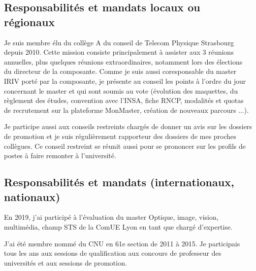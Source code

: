 \documentclass[a4paper,12pt]{article}
\begin{document}
\subsection{Responsabilités et mandats locaux ou régionaux}

Je suis membre élu du collège A du conseil de Telecom Physique Strasbourg depuis 2010. Cette mission consiste principalement à assister aux 3 réunions annuelles, plus quelques réunions extraordinaires, notamment lors des élections du directeur de la composante. Comme je suis aussi coresponsable du master IRIV porté par la composante, je présente au conseil les points à l'ordre du jour concernant le master et qui sont soumis au vote (évolution des maquettes, du règlement des études, convention avec l'INSA, fiche RNCP, modalités et quotas de recrutement sur la plateforme MonMaster, création de nouveaux parcours ...).

Je participe aussi aux conseils restreints chargés de donner un avis sur les dossiers de promotion et je suis régulièrement rapporteur des dossiers de mes proches collègues. Ce conseil restreint se réunit aussi pour se prononcer sur les profils de postes à faire remonter à l'université.

\subsection{Responsabilités et mandats (internationaux, nationaux)}

En 2019, j'ai participé à l'évaluation du master Optique, image, vision, multimédia, champ STS de la ComUE Lyon en tant que chargé d'expertise.

J'ai été membre nommé du CNU en 61e section de 2011 à 2015. Je participais tous les ans aux sessions de qualification aux concours de professeur des universités et aux sessions de promotion.
\end{document}
